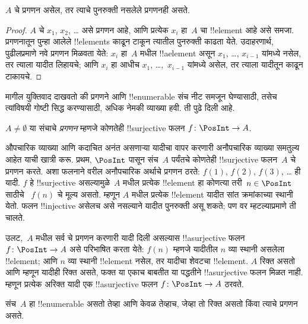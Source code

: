 \documentclass[../../../include/open-logic-section]{subfiles}
\begin{document}
\begin{prop}
  $A$ चे प्रगणन असेल, तर त्याचे पुनरुक्ती नसलेले प्रगणनही असते.
\end{prop}

\begin{proof}
  $A$ चे $x_1$, $x_2$, \dots{} असे प्रगणन आहे, आणि प्रत्येक
  $x_i$ हा~$A$ चा !!{element} आहे असे समजा. प्रगणनातून पुन्हा
  आलेले !!{element}s काढून टाकून त्यातील पुनरुक्ती काढता येते.
  उदाहरणार्थ, पुढीलप्रमाणे नवे प्रगणन मिळवता येते: $x_i$ हा~$A$
  मधील !!a{element} असून $x_1$, \dots, $x_{i-1}$ यांमध्ये नसेल,
  तर त्याला यादीत लिहायचे; आणि $x_i$ हा आधीच $x_1$, \dots,~$x_{i-1}$
  यांमध्ये असेल, तर त्याला यादीतून काढून टाकायचे.
\end{proof}

मागील युक्तिवाद दाखवतो की प्रगणने आणि !!{enumerable} संच नीट
समजून घेण्यासाठी, तसेच त्यांविषयी गोष्टी सिद्ध करण्यासाठी,
अधिक नेमकी व्याख्या हवी. ती पुढे दिली आहे.

\begin{defn}
$A \neq \emptyset$ या संचाचे \emph{प्रगणन} म्हणजे कोणतेही
!!{surjective} फलन $f \colon \PosInt \to A$.
\end{defn}

\begin{explain}
औपचारिक व्याख्या आणि कदाचित अनंत असणाऱ्या यादीचा वापर करणारी
अनौपचारिक व्याख्या समतुल्य आहेत याची खात्री करू. प्रथम, $\PosInt$
पासून संच~$A$ पर्यंतचे कोणतेही !!{surjective} फलन~$A$ चे प्रगणन करते.
अशा फलनाने वरील अनौपचारिक अर्थाचे प्रगणन ठरते: $f(1)$, $f(2)$,
$f(3)$, \dots{} ही यादी. $f$ हे !!{surjective} असल्यामुळे~$A$
मधील प्रत्येक !!{element} हा कोणत्या तरी~$n \in \PosInt$ साठीचे
~$f(n)$ चे मूल्य असतो. म्हणून $A$ मधील प्रत्येक !!{element} यादीत
सांत क्रमांकाच्या स्थानी येतो. फलन !!{injective} असेलच असे नसल्याने
यादीत पुनरुक्ती असू शकते; पण वर म्हटल्याप्रमाणे ती चालते.

उलट,~$A$ मधील सर्व चे प्रगणन करणारी यादी दिली असल्यास
!!a{surjective} फलन $f\colon \PosInt \to A$ असे परिभाषित करता येते:
$f(n)$ म्हणजे यादीतील $n$ व्या स्थानी असलेला !!{element}; आणि
$n$ व्या स्थानी !!{element} नसेल, तर यादीचा शेवटचा !!{element}.
$A$ रिक्त असतो आणि म्हणून यादीही रिक्त असते, फक्त या एकाच बाबतीत
या पद्धतीने !!a{surjective} फलन मिळत नाही. म्हणून प्रत्येक अरिक्त
यादी एक !!a{surjective} फलन $f\colon \PosInt \to A$ ठरवते.
\end{explain}

\begin{defn}
  संच~$A$ हा !!{enumerable} असतो तेव्हा आणि केवळ तेव्हाच,
  जेव्हा तो रिक्त असतो किंवा त्याचे प्रगणन असते.
\end{defn}
\end{document}
